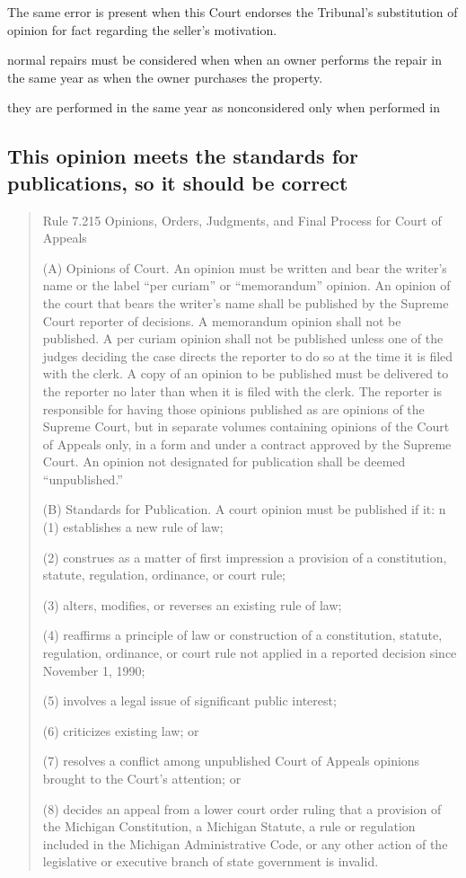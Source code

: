 \documentclass[12pt,\documentclassflag]{michiganCourtOfAppealsBrief}
\begin{document}
The same error is present when this Court endorses the Tribunal's substitution of opinion for fact regarding the seller's motivation.


normal repairs must be considered when when an owner performs the repair in the same year as when the owner purchases the property.

they are performed in the same year as  nonconsidered only when performed in

\subsection{This opinion meets the standards for publications, so it should be correct}

\begin{quotation}
  Rule 7.215 Opinions, Orders, Judgments, and Final Process for Court of Appeals

(A) Opinions of Court. An opinion must be written and bear the writer's name or the label ``per curiam'' or ``memorandum'' opinion. An opinion of the court that bears the writer's name shall be published by the Supreme Court reporter of decisions. A memorandum opinion shall not be published. A per curiam opinion shall not be published unless one of the judges deciding the case directs the reporter to do so at the time it is filed with the clerk. A copy of an opinion to be published must be delivered to the reporter no later than when it is filed with the clerk. The reporter is responsible for having those opinions published as are opinions of the Supreme Court, but in separate volumes containing opinions of the Court of Appeals only, in a form and under a contract approved by the Supreme Court. An opinion not designated for publication shall be deemed ``unpublished.''

(B) Standards for Publication. A court opinion must be published if it:
n
(1) establishes a new rule of law;

(2) construes as a matter of first impression a provision of a constitution, statute, regulation, ordinance, or court rule;

(3) alters, modifies, or reverses an existing rule of law;

(4) reaffirms a principle of law or construction of a constitution, statute, regulation, ordinance, or court rule not applied in a reported decision since November 1, 1990;

(5) involves a legal issue of significant public interest;

(6) criticizes existing law; or

(7) resolves a conflict among unpublished Court of Appeals opinions brought to the Court's attention; or

(8) decides an appeal from a lower court order ruling that a provision of the Michigan Constitution, a Michigan Statute, a rule or regulation included in the Michigan Administrative Code, or any other action of the legislative or executive branch of state government is invalid.
\end{quotation}
\end{document}

